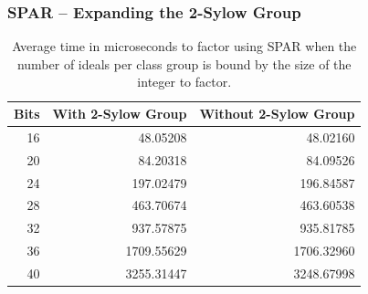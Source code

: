 \documentclass{beamer}
\begin{document}
\begin{frame}
\frametitle{SPAR -- Expanding the 2-Sylow Group}
\begin{table}
\centering
\begin{tabular}{| r | r | r |}
	\hline
	Bits & With 2-Sylow Group & Without 2-Sylow Group \\
	\hline
	16 &   48.05208 &   48.02160 \\
	20 &   84.20318 &   84.09526 \\
	24 &  197.02479 &  196.84587 \\
	28 &  463.70674 &  463.60538 \\
	32 &  937.57875 &  935.81785 \\
	36 & 1709.55629 & 1706.32960 \\
	40 & 3255.31447 & 3248.67998 \\
	\hline
\end{tabular}
\caption{Average time in microseconds to factor using SPAR when the number of ideals per class group is bound by the size of the integer to factor.}
\end{table}
\end{frame}
\end{document}
